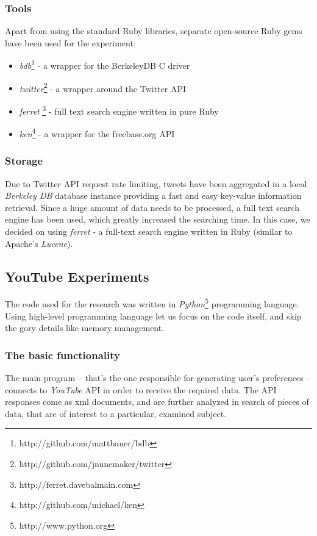 \subsubsection{Tools}
Apart from using the standard Ruby libraries, separate open-source Ruby gems have been used for the experiment:
\begin{itemize}
  \item \textit{bdb}\footnote{http://github.com/mattbauer/bdb} - a wrapper for the BerkeleyDB C driver
  \item \textit{twitter}\footnote{http://github.com/jnunemaker/twitter} - a wrapper around the Twitter API
  \item \textit{ferret} \footnote{http://ferret.davebalmain.com} - full text search engine written in pure Ruby
  \item \textit{ken}\footnote{http://github.com/michael/ken} - a wrapper for the freebase.org API
\end{itemize}

\subsubsection{Storage}
Due to Twitter API request rate limiting, tweets have been aggregated in a local
\textit{Berkeley DB} database instance providing a fast and easy key-value
information retrieval. Since a huge amount of data needs to be processed, a full
text search engine has been used, which greatly increased the searching time. In
this case, we decided on using \textit{ferret} - a full-text search engine
written in Ruby (similar to Apache's \textit{Lucene}).

\subsection{YouTube Experiments}
The code used for the research was written in \textit{Python}\footnote{http://www.python.org}
programming language. Using high-level programming language let us focus on the code itself, and skip the
gory details like memory management.

\subsubsection{The basic functionality}
The main program -- that's the one responsible for generating user's preferences
-- connects to \textit{YouTube} API in order to receive the required data. The
API responses come as xml documents, and are further analyzed in search of
pieces of data, that are of interest to a particular, examined subject.

